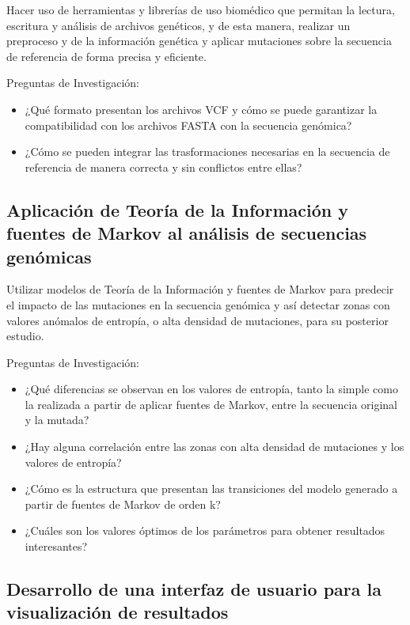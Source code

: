 \documentclass[11pt,spanish,listoffigures,listoftables]{tfgetsinf}
\begin{document}
Hacer uso de herramientas y librerías de uso biomédico que permitan la lectura, escritura y análisis de archivos genéticos, y de esta manera, realizar un preproceso y de la información genética y aplicar mutaciones sobre la secuencia de referencia de forma precisa y eficiente.

Preguntas de Investigación: 
\begin{itemize}
\item ¿Qué formato presentan los archivos \acs{VCF} y cómo se puede garantizar la compatibilidad con los archivos \acs{FASTA} con la secuencia genómica?
\item ¿Cómo se pueden integrar las trasformaciones necesarias en la secuencia de referencia de manera correcta y sin conflictos entre ellas?
\end{itemize}

\subsection{Aplicación de Teoría de la Información y fuentes de Markov al análisis de secuencias genómicas }

Utilizar modelos de Teoría de la Información y fuentes de Markov para predecir el impacto de las mutaciones en la secuencia genómica y así detectar zonas con valores anómalos de entropía, o alta densidad de mutaciones, para su posterior estudio. 

Preguntas de Investigación: 
\begin{itemize}
\item ¿Qué diferencias se observan en los valores de entropía, tanto la simple como la realizada a partir de aplicar fuentes de Markov, entre la secuencia original y la mutada? 
\item ¿Hay alguna correlación entre las zonas con alta densidad de mutaciones y los valores de entropía? 
\item ¿Cómo es la estructura que presentan las transiciones del modelo generado a partir de fuentes de Markov de orden k? 
\item ¿Cuáles son los valores óptimos de los parámetros para obtener resultados interesantes? 
\end{itemize}

\subsection{Desarrollo de una interfaz de usuario para la visualización de resultados }
\end{document}

